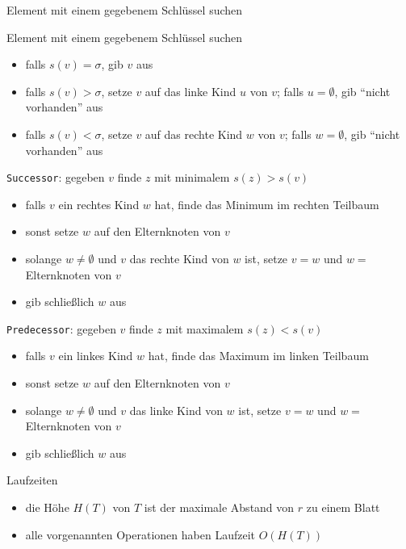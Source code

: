 \documentclass[aspectratio=1610, 11pt]{beamer}
\begin{document}
\begin{frame}
\begin{overprint}
\begin{exampleblock}{Element mit einem gegebenem Schl\"ussel suchen}
\begin{itemize}
			\end{itemize}
		\end{exampleblock}
		\begin{exampleblock}{Element mit einem gegebenem Schl\"ussel suchen}
			\begin{itemize}
				\item falls $s(v)=\sigma$, gib $v$ aus
				\item falls $s(v)>\sigma$, setze $v$ auf das linke Kind $u$ von $v$; falls $u=\emptyset$, gib ``nicht vorhanden'' aus
				\item falls $s(v)<\sigma$, setze $v$ auf das rechte Kind $w$ von $v$; falls $w=\emptyset$, gib ``nicht vorhanden'' aus
			\end{itemize}
		\end{exampleblock}
		\begin{exampleblock}{{\tt Successor}: gegeben $v$ finde $z$ mit minimalem $s(z)>s(v)$}
			\begin{itemize}
				\item falls $v$ ein rechtes Kind $w$ hat, finde das Minimum im rechten Teilbaum
				\item sonst setze $w$ auf den Elternknoten von $v$
				\item solange $w\neq\emptyset$ und $v$ das rechte Kind von $w$ ist, setze $v=w$ und $w=$Elternknoten von $v$
				\item gib schlie\ss lich $w$ aus
			\end{itemize}
		\end{exampleblock}
		\begin{exampleblock}{{\tt Predecessor}: gegeben $v$ finde $z$ mit maximalem $s(z)<s(v)$}
			\begin{itemize}
				\item falls $v$ ein linkes Kind $w$ hat, finde das Maximum im linken Teilbaum
				\item sonst setze $w$ auf den Elternknoten von $v$
				\item solange $w\neq\emptyset$ und $v$ das linke Kind von $w$ ist, setze $v=w$ und $w=$Elternknoten von $v$
				\item gib schlie\ss lich $w$ aus
			\end{itemize}
		\end{exampleblock}
		\begin{exampleblock}{Laufzeiten}
			\begin{itemize}
				\item die \alert{H\"ohe} $H(T)$ von $T$ ist der maximale Abstand von $r$ zu einem Blatt
				\item alle vorgenannten Operationen haben Laufzeit $O(H(T))$
			\end{itemize}
		\end{exampleblock}
	\end{overprint}
\end{frame}
\end{document}
